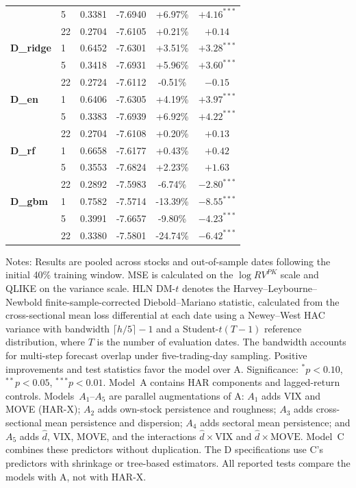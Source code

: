 \begin{table}[htbp]
\begin{tabular}{llcccc}
 &  5 & 0.3381 & -7.6940 & +6.97\% & $+4.16^{***}$ \\
 & 22 & 0.2704 & -7.6105 & +0.21\% & $+0.14$ \\
\midrule
\textbf{D\_ridge} &  1 & 0.6452 & -7.6301 & +3.51\% & $+3.28^{***}$ \\
 &  5 & 0.3418 & -7.6931 & +5.96\% & $+3.60^{***}$ \\
 & 22 & 0.2724 & -7.6112 & -0.51\% & $-0.15$ \\
\midrule
\textbf{D\_en} &  1 & 0.6406 & -7.6305 & +4.19\% & $+3.97^{***}$ \\
 &  5 & 0.3383 & -7.6939 & +6.92\% & $+4.22^{***}$ \\
 & 22 & 0.2704 & -7.6108 & +0.20\% & $+0.13$ \\
\midrule
\textbf{D\_rf} &  1 & 0.6658 & -7.6177 & +0.43\% & $+0.42$ \\
 &  5 & 0.3553 & -7.6824 & +2.23\% & $+1.63$ \\
 & 22 & 0.2892 & -7.5983 & -6.74\% & $-2.80^{***}$ \\
\midrule
\textbf{D\_gbm} &  1 & 0.7582 & -7.5714 & -13.39\% & $-8.55^{***}$ \\
 &  5 & 0.3991 & -7.6657 & -9.80\% & $-4.23^{***}$ \\
 & 22 & 0.3380 & -7.5801 & -24.74\% & $-6.42^{***}$ \\
\bottomrule
\end{tabular}
\begin{tablenotes}\small
\footnotesize
\item Notes: Results are pooled across stocks and out-of-sample dates
following the initial 40\% training window. MSE is calculated on the
$\log RV^{PK}$ scale and QLIKE on the variance scale. HLN DM-$t$ denotes
the Harvey--Leybourne--Newbold finite-sample-corrected Diebold--Mariano
statistic, calculated from the cross-sectional mean loss differential at
each date using a Newey--West HAC variance with bandwidth
$\lceil h/5\rceil-1$ and a Student-$t(T-1)$ reference distribution, where
$T$ is the number of evaluation dates. The bandwidth accounts for
multi-step forecast overlap under five-trading-day sampling. Positive
improvements and test statistics favor the model over A. Significance:
$^{*}p<0.10$, $^{**}p<0.05$, $^{***}p<0.01$.
Model~A contains HAR components and lagged-return controls.
Models~$A_1$--$A_5$ are parallel augmentations of A: $A_1$ adds VIX and
MOVE (HAR-X); $A_2$ adds own-stock persistence and roughness; $A_3$ adds
cross-sectional mean persistence and dispersion; $A_4$ adds sectoral mean
persistence; and $A_5$ adds $\hat d$, VIX, MOVE, and the interactions
$\hat d\times\mathrm{VIX}$ and $\hat d\times\mathrm{MOVE}$.
Model~C combines these predictors without duplication. The D specifications
use C's predictors with shrinkage or tree-based estimators. All reported
tests compare the models with A, not with HAR-X.
\end{tablenotes}
\end{table}
